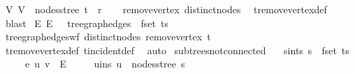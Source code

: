\begin{isabellebody}
\isanewline
{}\isamarkupfalse%
\ V{\isacharprime}{\kern0pt}{\isacharcolon}{\kern0pt}\ {\isachardoublequoteopen}V{\isacharprime}{\kern0pt}\ {\isacharequal}{\kern0pt}\ nodes{\isacharunderscore}{\kern0pt}stree\ t\ {\isacharminus}{\kern0pt}\ {\isacharbraceleft}{\kern0pt}r{\isacharbraceright}{\kern0pt}{\isachardoublequoteclose}\isanewline
%
\isadelimproof
\ \ %
\endisadelimproof
%
\isatagproof
{}\isamarkupfalse%
\ remove{\isacharunderscore}{\kern0pt}vertex\ distinct{\isacharunderscore}{\kern0pt}nodes\ \isamarkupfalse%
\ t{\isachardot}{\kern0pt}remove{\isacharunderscore}{\kern0pt}vertex{\isacharunderscore}{\kern0pt}def\ \isamarkupfalse%
\ blast%
\endisatagproof
{\isafoldproof}%
%
\isadelimproof
\isanewline
%
\endisadelimproof
\isanewline
{}\isamarkupfalse%
\ E{\isacharprime}{\kern0pt}{\isacharcolon}{\kern0pt}\ {\isachardoublequoteopen}E{\isacharprime}{\kern0pt}\ {\isacharequal}{\kern0pt}\ {\isasymUnion}\ {\isacharparenleft}{\kern0pt}tree{\isacharunderscore}{\kern0pt}graph{\isacharunderscore}{\kern0pt}edges\ {\isacharbackquote}{\kern0pt}\ fset\ ts{\isacharparenright}{\kern0pt}{\isachardoublequoteclose}\isanewline
%
\isadelimproof
\ \ %
\endisadelimproof
%
\isatagproof
{}\isamarkupfalse%
\ tree{\isacharunderscore}{\kern0pt}graph{\isacharunderscore}{\kern0pt}edges{\isacharunderscore}{\kern0pt}wf\ distinct{\isacharunderscore}{\kern0pt}nodes\ remove{\isacharunderscore}{\kern0pt}vertex\ t\ \isamarkupfalse%
\ t{\isachardot}{\kern0pt}remove{\isacharunderscore}{\kern0pt}vertex{\isacharunderscore}{\kern0pt}def\ t{\isachardot}{\kern0pt}incident{\isacharunderscore}{\kern0pt}def\ \isamarkupfalse%
\ auto%
\endisatagproof
{\isafoldproof}%
%
\isadelimproof
\isanewline
%
\endisadelimproof
\isanewline
{}\isamarkupfalse%
\ subtrees{\isacharunderscore}{\kern0pt}not{\isacharunderscore}{\kern0pt}connected{\isacharcolon}{\kern0pt}\isanewline
\ \ \ s{\isacharunderscore}{\kern0pt}in{\isacharunderscore}{\kern0pt}ts{\isacharcolon}{\kern0pt}\ {\isachardoublequoteopen}s\ {\isasymin}\ fset\ ts{\isachardoublequoteclose}\isanewline
\ \ \ \ \ e{\isacharcolon}{\kern0pt}\ {\isachardoublequoteopen}{\isacharbraceleft}{\kern0pt}u{\isacharcomma}{\kern0pt}\ v{\isacharbraceright}{\kern0pt}\ {\isasymin}\ E{\isacharprime}{\kern0pt}{\isachardoublequoteclose}\isanewline
\ \ \ \ \ u{\isacharunderscore}{\kern0pt}in{\isacharunderscore}{\kern0pt}s{\isacharcolon}{\kern0pt}\ {\isachardoublequoteopen}u\ {\isasymin}\ nodes{\isacharunderscore}{\kern0pt}stree\ s{\isachardoublequoteclose}\isanewline

\end{isabellebody}
